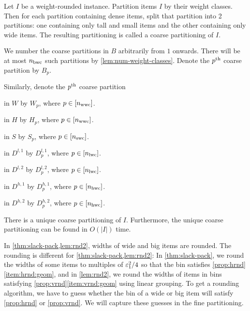 \begin{definition}
Let $I$ be a weight-rounded instance. Partition items $I$ by their weight classes.
Then for each partition containing dense items, split that partition into 2 partitions:
one containing only tall and small items and the other containing only wide items.
The resulting partitioning is called a coarse partitioning of $I$.

We number the coarse partitions in $B$ arbitrarily from $1$ onwards.
There will be at most $n_{\mathrm{bwc}}$ such partitions by \cref{lem:num-weight-classes}.
Denote the $p^{\textrm{th}}$ coarse partition by $B_p$.

Similarly, denote the $p^{\textrm{th}}$ coarse partition
\begin{tightemize}
\item in $W$ by $W_p$, where $p \in [n_{\mathrm{wwc}}]$.
\item in $H$ by $H_p$, where $p \in [n_{\mathrm{wwc}}]$.
\item in $S$ by $S_p$, where $p \in [n_{\mathrm{swc}}]$.
\item in $D^{l,1}$ by $D^{l,1}_p$, where $p \in [n_{\mathrm{lwc}}]$.
\item in $D^{l,2}$ by $D^{l,2}_p$, where $p \in [n_{\mathrm{lwc}}]$.
\item in $D^{h,1}$ by $D^{h,1}_p$, where $p \in [n_{\mathrm{hwc}}]$.
\item in $D^{h,2}$ by $D^{h,2}_p$, where $p \in [n_{\mathrm{hwc}}]$.
\end{tightemize}
\end{definition}

\begin{observation}
\label{obs:coarse-part}
There is a unique coarse partitioning of $I$.
Furthermore, the unique coarse partitioning can be found in $O(|I|)$ time.
\end{observation}

In \cref{thm:slack-pack,lem:rnd2}, widths of wide and big items are rounded.
The rounding is different for \cref{thm:slack-pack,lem:rnd2}:
In \cref{thm:slack-pack}, we round the widths of some items to multiples of $\varepsilon_1^2/4$
so that the bin satisfies \cref{prop:hrnd}\ref{item:hrnd:geom},
and in \cref{lem:rnd2}, we round the widths of items in bins satisfying
\cref{prop:vrnd}\ref{item:vrnd:geom} using linear grouping.
To get a rounding algorithm, we have to guess whether the bin of a wide or big item
will satisfy \cref{prop:hrnd} or \cref{prop:vrnd}.
We will capture these guesses in the fine partitioning.

